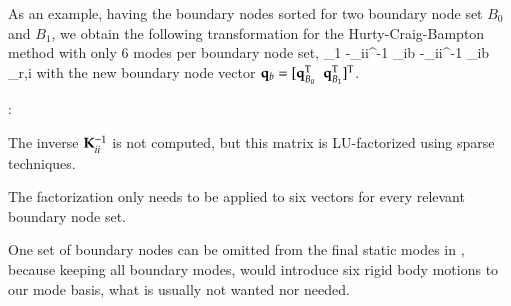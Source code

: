 As an example, having the boundary nodes sorted for two boundary node set $B_0$ and $B_1$, we obtain the following transformation for the Hurty-Craig-Bampton method with only 6 modes per boundary node set,
\be \label{theory:eigenmodes:HCBRBE2}
	 \approx {} {\Null}{\Tm_1}{\Null} 
	                          {-\Km_{ii}^{-1} \Km_{ib} }{-\Km_{ii}^{-1} \Km_{ib} }{\tPsi_{r,i}}   
	 \eqDot
\ee
with the new boundary node vector $\mathbf{q}_b = [\mathbf{q}_{B_0}^\mathrm{T} \;\; \mathbf{q}_{B_1}^\mathrm{T}]^\mathrm{T}$.

:
\bi
  \item The inverse $\mathbf{K}_{ii}^{-1} $ is not computed, but this matrix is LU-factorized using sparse techniques.
	\item The factorization only needs to be applied to six vectors for every relevant boundary node set.
	\item One set of boundary nodes can be omitted from the final static modes in , because keeping all boundary modes, would introduce six rigid body motions to our mode basis, what is usually not wanted nor needed.
\ei

